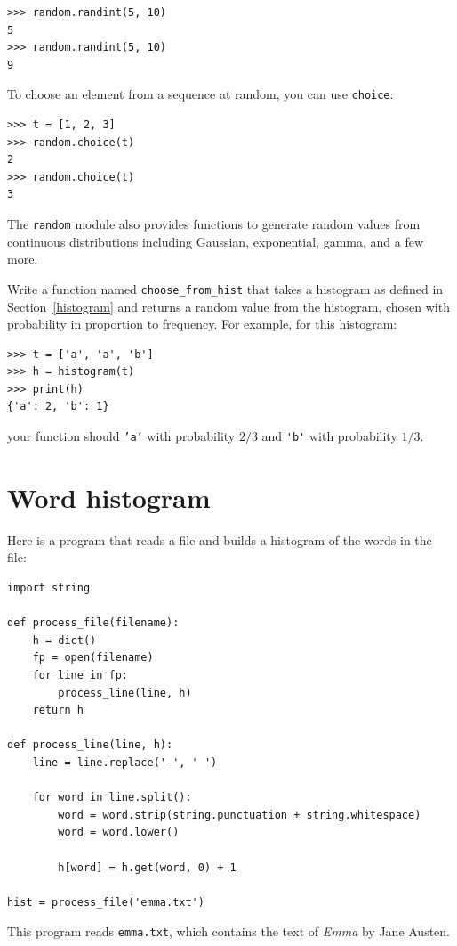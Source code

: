 \documentclass[10pt]{book}
\begin{document}

\beforeverb
\begin{verbatim}
>>> random.randint(5, 10)
5
>>> random.randint(5, 10)
9
\end{verbatim}
\afterverb
%
To choose an element from a sequence at random, you can use
{\tt choice}:


\beforeverb
\begin{verbatim}
>>> t = [1, 2, 3]
>>> random.choice(t)
2
>>> random.choice(t)
3
\end{verbatim}
\afterverb
%
The {\tt random} module also provides functions to generate
random values from continuous distributions including
Gaussian, exponential, gamma, and a few more.

\begin{ex}


Write a function named \verb"choose_from_hist" that takes
a histogram as defined in Section~\ref{histogram} and returns a 
random value from the histogram, chosen with probability
in proportion to frequency.  For example, for this histogram:

\beforeverb
\begin{verbatim}
>>> t = ['a', 'a', 'b']
>>> h = histogram(t)
>>> print(h)
{'a': 2, 'b': 1}
\end{verbatim}
\afterverb
%
your function should {\tt 'a'} with probability $2/3$ and \verb"'b'"
with probability $1/3$.
\end{ex}


\section{Word histogram}

Here is a program that reads a file and builds a histogram of the
words in the file:


\beforeverb
\begin{verbatim}
import string

def process_file(filename):
    h = dict()
    fp = open(filename)
    for line in fp:
        process_line(line, h)
    return h

def process_line(line, h):
    line = line.replace('-', ' ')
    
    for word in line.split():
        word = word.strip(string.punctuation + string.whitespace)
        word = word.lower()

        h[word] = h.get(word, 0) + 1

hist = process_file('emma.txt')
\end{verbatim}
\afterverb
%
This program reads {\tt emma.txt}, which contains the text of {\em
  Emma} by Jane Austen.
\end{document}
